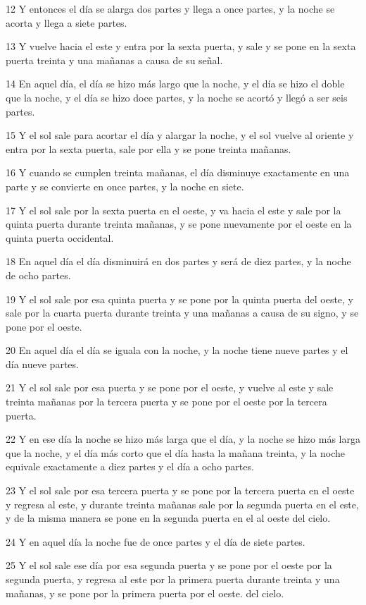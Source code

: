 \par 12 Y entonces el día se alarga dos partes y llega a once partes, y la noche se acorta y llega a siete partes.
\par 13 Y vuelve hacia el este y entra por la sexta puerta, y sale y se pone en la sexta puerta treinta y una mañanas a causa de su señal.
\par 14 En aquel día, el día se hizo más largo que la noche, y el día se hizo el doble que la noche, y el día se hizo doce partes, y la noche se acortó y llegó a ser seis partes.
\par 15 Y el sol sale para acortar el día y alargar la noche, y el sol vuelve al oriente y entra por la sexta puerta, sale por ella y se pone treinta mañanas.
\par 16 Y cuando se cumplen treinta mañanas, el día disminuye exactamente en una parte y se convierte en once partes, y la noche en siete.
\par 17 Y el sol sale por la sexta puerta en el oeste, y va hacia el este y sale por la quinta puerta durante treinta mañanas, y se pone nuevamente por el oeste en la quinta puerta occidental.
\par 18 En aquel día el día disminuirá en dos partes y será de diez partes, y la noche de ocho partes.
\par 19 Y el sol sale por esa quinta puerta y se pone por la quinta puerta del oeste, y sale por la cuarta puerta durante treinta y una mañanas a causa de su signo, y se pone por el oeste.
\par 20 En aquel día el día se iguala con la noche, y la noche tiene nueve partes y el día nueve partes.
\par 21 Y el sol sale por esa puerta y se pone por el oeste, y vuelve al este y sale treinta mañanas por la tercera puerta y se pone por el oeste por la tercera puerta.
\par 22 Y en ese día la noche se hizo más larga que el día, y la noche se hizo más larga que la noche, y el día más corto que el día hasta la mañana treinta, y la noche equivale exactamente a diez partes y el día a ocho partes.
\par 23 Y el sol sale por esa tercera puerta y se pone por la tercera puerta en el oeste y regresa al este, y durante treinta mañanas sale por la segunda puerta en el este, y de la misma manera se pone en la segunda puerta en el al oeste del cielo.
\par 24 Y en aquel día la noche fue de once partes y el día de siete partes.
\par 25 Y el sol sale ese día por esa segunda puerta y se pone por el oeste por la segunda puerta, y regresa al este por la primera puerta durante treinta y una mañanas, y se pone por la primera puerta por el oeste. del cielo.
